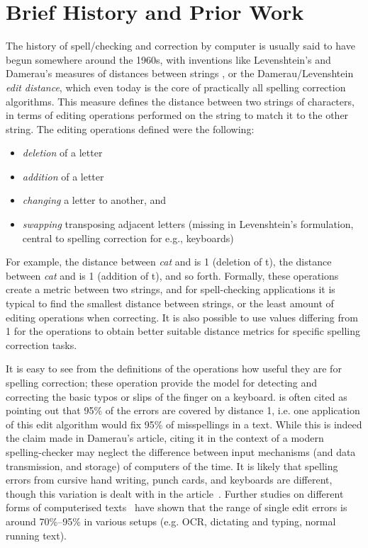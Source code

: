 \documentclass[officiallayout,final]{unihelcompling}
\newcommand\misspelt{\bgroup\markoverwith
{\lower3.5pt\hbox{\sixly \char58}}\ULon}
\newcommand\misspelt{\bgroup\markoverwith
{\textcolor{red}{\lower3.5pt\hbox{\sixly \char58}}}\ULon}
\begin{document}
\section{Brief History and Prior Work}
\label{sec:history}

The history of spell\-/checking and correction by computer is usually said to
have begun somewhere around the 1960s, with inventions like Levenshtein's and
Damerau's measures of distances between strings
\citep{levenshtein1966binary,damerau1964technique}, or the
Damerau\-/Levenshtein \emph{edit distance}, which even today is the core of
practically all spelling correction algorithms. This measure defines the
distance between two strings of characters, in terms of editing operations
performed on the string to match it to the other string. The editing operations
defined were the following:

\begin{itemize}
    \item \emph{deletion} of a letter
    \item \emph{addition} of a letter
    \item \emph{changing} a letter to another, and
    \item \emph{swapping} transposing adjacent letters (missing in
        Levenshtein's formulation, central to spelling correction for
        e.g., keyboards)
\end{itemize}

For example, the distance between \emph{cat} and \misspelt{ca} is 1 (deletion
of t), the distance between \emph{cat} and \misspelt{catt} is 1 (addition of
t), and so forth. Formally, these operations create a metric between two
strings, and for spell-checking applications it is typical to find the smallest
distance between strings, or the least amount of editing operations when
correcting. It is also possible to use values differing from 1 for the
operations to obtain better suitable distance metrics for specific spelling
correction tasks.

It is easy to see from the definitions of the operations how useful they are
for spelling correction; these operation provide the model for detecting and
correcting the basic typos or slips of the finger on a keyboard.
\citet{damerau1964technique} is often cited as pointing out that 95\% of the
errors are covered by distance 1, i.e. one application of this edit algorithm
would fix 95\% of misspellings in a text.  While this is indeed the claim made
in Damerau's article, citing it in the context of a modern spelling-checker may
neglect the difference between input mechanisms (and data transmission, and
storage) of computers of the time. It is likely that spelling errors from
cursive hand writing, punch cards, and keyboards are different, though this
variation is dealt with in the article~\citep{damerau1964technique}. Further
studies on different forms of computerised texts~\citep{kukich1992techniques}
have shown that the range of single edit errors is around 70\%--95\% in various
setups (e.g. OCR, dictating and typing, normal running text).
\end{document}
